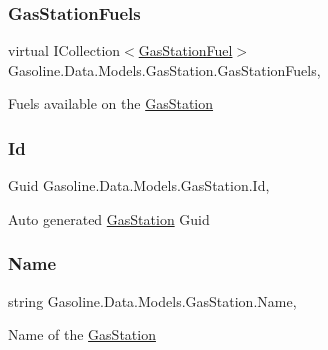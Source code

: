 \subsubsection{\texorpdfstring{GasStationFuels}{GasStationFuels}}
{\footnotesize\ttfamily virtual I\+Collection$<$\mbox{\hyperlink{class_gasoline_1_1_data_1_1_models_1_1_gas_station_fuel}{Gas\+Station\+Fuel}}$>$ Gasoline.\+Data.\+Models.\+Gas\+Station.\+Gas\+Station\+Fuels\hspace{0.3cm}{\ttfamily [get]}, {\ttfamily [set]}}



Fuels available on the \mbox{\hyperlink{class_gasoline_1_1_data_1_1_models_1_1_gas_station}{Gas\+Station}} 

\mbox{\label{class_gasoline_1_1_data_1_1_models_1_1_gas_station_a9d4760a89b8a64b387f6b14d02aa876d}} 
\subsubsection{\texorpdfstring{Id}{Id}}
{\footnotesize\ttfamily Guid Gasoline.\+Data.\+Models.\+Gas\+Station.\+Id\hspace{0.3cm}{\ttfamily [get]}, {\ttfamily [set]}}



Auto generated \mbox{\hyperlink{class_gasoline_1_1_data_1_1_models_1_1_gas_station}{Gas\+Station}} Guid 

\mbox{\label{class_gasoline_1_1_data_1_1_models_1_1_gas_station_a13a8f1f8a9dfa3a93741e1b6f9817eb6}} 
\subsubsection{\texorpdfstring{Name}{Name}}
{\footnotesize\ttfamily string Gasoline.\+Data.\+Models.\+Gas\+Station.\+Name\hspace{0.3cm}{\ttfamily [get]}, {\ttfamily [set]}}



Name of the \mbox{\hyperlink{class_gasoline_1_1_data_1_1_models_1_1_gas_station}{Gas\+Station}} 

